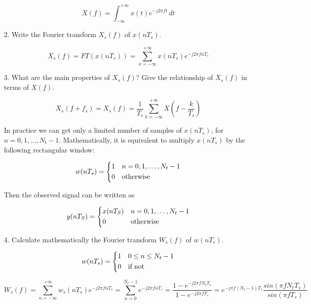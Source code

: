 \documentclass{article}
\begin{document}
\begin{equation}
    X(f) = \int_{-\infty}^{+\infty}x(t)e^{-j2\pi ft}\,dt
\end{equation}

2. Write the Fourier transform $X_s(f)$ of $x(nT_s)$.

\begin{equation}
    X_s(f) = FT(x(nT_s)) = \sum_{n=-\infty}^{+\infty} x(nT_s)e^{-j2\pi fnT_s}
\end{equation}

3. What are the main properties of $X_s(f)$? Give the relationship of $X_s(f)$ in terms of $X(f)$.

\begin{equation}
    X_s(f+f_s) = X_s(f) = \frac{1}{T_s} \sum_{k=-\infty}^{+\infty}X(f-\frac{k}{T_s})
\end{equation}

In practice we can get only a limited number of samples of $x(nT_s)$, for $n = 0,1,\ldots,N_t-1$. Mathematically, it is equivalent to multiply $x(nT_s)$ by the following rectangular window:

\[
w(nT_s) =
\begin{dcases}
    1 & n = 0,1,\ldots,N_t-1\\
    0 & \text{otherwise}
\end{dcases}
\]

Then the observed signal can be written as 

\[
y(nT_S)=
\begin{dcases}
    x(nT_S) & n = 0,1,\ldots,N_t-1\\
    0 & \text{otherwise}
\end{dcases}
\]

4. Calculate mathematically the Fourier transform $W_s(f)$ of $w(nT_s)$.

\begin{equation}
    w(nT_s) =
    \begin{dcases}
        1 & 0 \leq n \leq N_t-1\\
        0 & \text{if not}
    \end{dcases}
\end{equation}

\begin{equation}
    W_s(f) 
    = \sum_{n=-\infty}^{+\infty}w_s(nT_s)e^{-j2\pi fnT_s}
    = \sum_{n=0}^{N_t-1}e^{-j2\pi fnT_s}
    = \frac{1-e^{-j2\pi fN_tT_s}}{1-e^{-j2\pi fT_s}}
    = e^{-j\pi f(N_t-1)T_s}\frac{sin(\pi fN_tT_s)}{sin(\pi fT_s)}
\end{equation}
\end{document}
